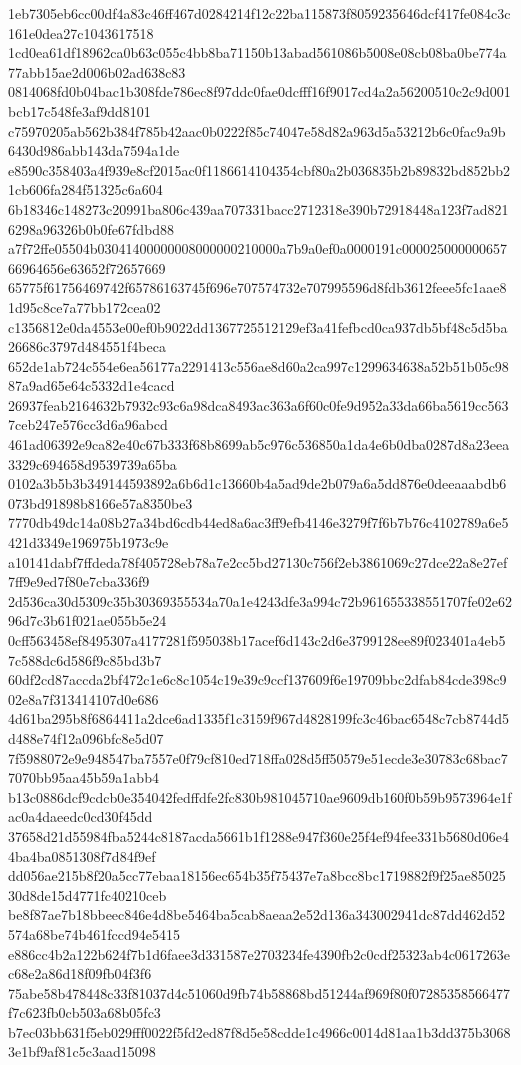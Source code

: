 {1eb7305eb6cc00df4a83c46ff467d0284214f12c22ba115873f8059235646dcf417fe084c3c161e0dea27c1043617518
1cd0ea61df18962ca0b63c055c4bb8ba71150b13abad561086b5008e08cb08ba0be774a77abb15ae2d006b02ad638c83
0814068fd0b04bac1b308fde786ec8f97ddc0fae0dcfff16f9017cd4a2a56200510c2c9d001bcb17c548fe3af9dd8101
c75970205ab562b384f785b42aac0b0222f85c74047e58d82a963d5a53212b6c0fac9a9b6430d986abb143da7594a1de
e8590c358403a4f939e8cf2015ac0f1186614104354cbf80a2b036835b2b89832bd852bb21cb606fa284f51325c6a604
6b18346c148273c20991ba806c439aa707331bacc2712318e390b72918448a123f7ad8216298a96326b0b0fe67fdbd88
a7f72ffe05504b03041400000008000000210000a7b9a0ef0a0000191c00002500000065766964656e63652f72657669
65775f61756469742f65786163745f696e707574732e707995596d8fdb3612feee5fc1aae81d95c8ce7a77bb172cea02
c1356812e0da4553e00ef0b9022dd1367725512129ef3a41fefbcd0ca937db5bf48c5d5ba26686c3797d484551f4beca
652de1ab724c554e6ea56177a2291413c556ae8d60a2ca997c1299634638a52b51b05c9887a9ad65e64c5332d1e4cacd
26937feab2164632b7932c93c6a98dca8493ac363a6f60c0fe9d952a33da66ba5619cc5637ceb247e576cc3d6a96abcd
461ad06392e9ca82e40c67b333f68b8699ab5c976c536850a1da4e6b0dba0287d8a23eea3329c694658d9539739a65ba
0102a3b5b3b349144593892a6b6d1c13660b4a5ad9de2b079a6a5dd876e0deeaaabdb6073bd91898b8166e57a8350be3
7770db49dc14a08b27a34bd6cdb44ed8a6ac3ff9efb4146e3279f7f6b7b76c4102789a6e5421d3349e196975b1973c9e
a10141dabf7ffdeda78f405728eb78a7e2cc5bd27130c756f2eb3861069c27dce22a8e27ef7ff9e9ed7f80e7cba336f9
2d536ca30d5309c35b30369355534a70a1e4243dfe3a994c72b961655338551707fe02e6296d7c3b61f021ae055b5e24
0cff563458ef8495307a4177281f595038b17acef6d143c2d6e3799128ee89f023401a4eb57c588dc6d586f9c85bd3b7
60df2cd87accda2bf472c1e6c8c1054c19e39c9ccf137609f6e19709bbc2dfab84cde398c902e8a7f313414107d0e686
4d61ba295b8f6864411a2dce6ad1335f1c3159f967d4828199fc3c46bac6548c7cb8744d5d488e74f12a096bfc8e5d07
7f5988072e9e948547ba7557e0f79cf810ed718ffa028d5ff50579e51ecde3e30783c68bac77070bb95aa45b59a1abb4
b13c0886dcf9cdcb0e354042fedffdfe2fc830b981045710ae9609db160f0b59b9573964e1fac0a4daeedc0cd30f45dd
37658d21d55984fba5244c8187acda5661b1f1288e947f360e25f4ef94fee331b5680d06e44ba4ba0851308f7d84f9ef
dd056ae215b8f20a5cc77ebaa18156ec654b35f75437e7a8bcc8bc1719882f9f25ae8502530d8de15d4771fc40210ceb
be8f87ae7b18bbeec846e4d8be5464ba5cab8aeaa2e52d136a343002941dc87dd462d52574a68be74b461fccd94e5415
e886cc4b2a122b624f7b1d6faee3d331587e2703234fe4390fb2c0cdf25323ab4c0617263ec68e2a86d18f09fb04f3f6
75abe58b478448c33f81037d4c51060d9fb74b58868bd51244af969f80f07285358566477f7c623fb0cb503a68b05fc3
b7ec03bb631f5eb029fff0022f5fd2ed87f8d5e58cdde1c4966c0014d81aa1b3dd375b30683e1bf9af81c5c3aad15098
}
